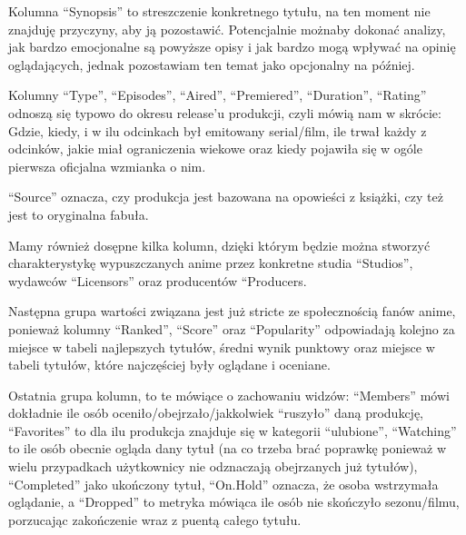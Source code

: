 \documentclass[
]{article}
\newenvironment{Shaded}{\begin{snugshade}}{\end{snugshade}}
\newcommand{\ConstantTok}[1]{\textcolor[rgb]{0.56,0.35,0.01}{#1}}
\newcommand{\NormalTok}[1]{#1}
\newcommand{\OtherTok}[1]{\textcolor[rgb]{0.56,0.35,0.01}{#1}}
\newcommand{\SpecialCharTok}[1]{\textcolor[rgb]{0.81,0.36,0.00}{\textbf{#1}}}
\begin{document}
\begin{Shaded}
\end{Shaded}

Kolumna ``Synopsis'' to streszczenie konkretnego tytułu, na ten moment
nie znajduję przyczyny, aby ją pozostawić. Potencjalnie możnaby dokonać
analizy, jak bardzo emocjonalne są powyższe opisy i jak bardzo mogą
wpływać na opinię oglądających, jednak pozostawiam ten temat jako
opcjonalny na później.

\begin{Shaded}
\end{Shaded}

Kolumny ``Type'', ``Episodes'', ``Aired'', ``Premiered'', ``Duration'',
``Rating'' odnoszą się typowo do okresu release'u produkcji, czyli mówią
nam w skrócie: Gdzie, kiedy, i w ilu odcinkach był emitowany
serial/film, ile trwał każdy z odcinków, jakie miał ograniczenia wiekowe
oraz kiedy pojawiła się w ogóle pierwsza oficjalna wzmianka o nim.

``Source'' oznacza, czy produkcja jest bazowana na opowieści z książki,
czy też jest to oryginalna fabuła.

Mamy również dosępne kilka kolumn, dzięki którym będzie można stworzyć
charakterystykę wypuszczanych anime przez konkretne studia ``Studios'',
wydawców ``Licensors'' oraz producentów ``Producers.

Następna grupa wartości związana jest już stricte ze społecznością fanów
anime, ponieważ kolumny ``Ranked'', ``Score'' oraz ``Popularity''
odpowiadają kolejno za miejsce w tabeli najlepszych tytułów, średni
wynik punktowy oraz miejsce w tabeli tytułów, które najczęściej były
oglądane i oceniane.

Ostatnia grupa kolumn, to te mówiące o zachowaniu widzów: ``Members''
mówi dokładnie ile osób oceniło/obejrzało/jakkolwiek ``ruszyło'' daną
produkcję, ``Favorites'' to dla ilu produkcja znajduje się w kategorii
``ulubione'', ``Watching'' to ile osób obecnie ogląda dany tytuł (na co
trzeba brać poprawkę ponieważ w wielu przypadkach użytkownicy nie
odznaczają obejrzanych już tytułów), ``Completed'' jako ukończony tytuł,
``On.Hold'' oznacza, że osoba wstrzymała oglądanie, a ``Dropped'' to
metryka mówiąca ile osób nie skończyło sezonu/filmu, porzucając
zakończenie wraz z puentą całego tytułu.
\end{document}
